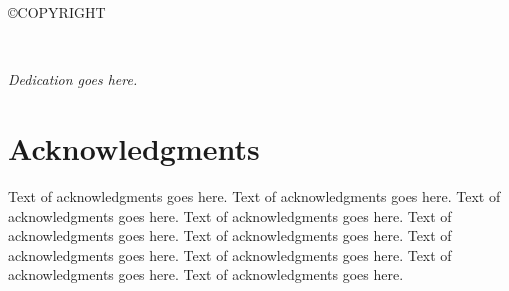 
\doublespacing

\thispagestyle{empty} %

\vspace*{\fill}

\begin{flushleft}
\mytitle

 \copyright \space COPYRIGHT
 
\myyear

\myauthorfull\\[24 pt] %

%
%

\end{flushleft}
\pagebreak 



\setcounter{page}{3}
\begin{center}
\textit{Dedication goes here.}
\end{center}


\chapter*{Acknowledgments}

Text of acknowledgments goes here.
Text of acknowledgments goes here.
Text of acknowledgments goes here.
Text of acknowledgments goes here.
Text of acknowledgments goes here.
Text of acknowledgments goes here.
Text of acknowledgments goes here.
Text of acknowledgments goes here.
Text of acknowledgments goes here.
Text of acknowledgments goes here.



\begingroup
\titleformat{\chapter}[hang]{\large\center}{\thechapter}{0 pt}{}
\titlespacing*{\chapter}{0pt}{-33 pt}{6 pt} %

